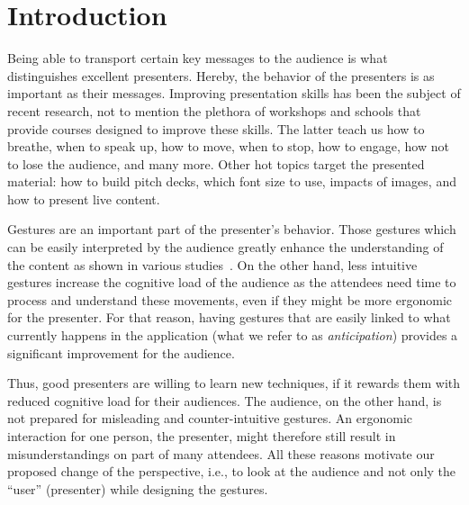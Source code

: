 \documentclass{sigchi}
\begin{document}



\section{Introduction}

Being able to transport certain key messages to the audience is what distinguishes excellent presenters. Hereby, the behavior of the presenters is as important as their messages. Improving presentation skills has been the subject of recent research, not to mention the plethora of workshops and schools that provide courses designed to improve these skills. The latter teach us how to breathe, when to speak up, how to move, when to stop, how to engage, how not to lose the audience, and many more. Other hot topics target the presented material: how to build pitch decks, which font size to use, impacts of images, and how to present live content.

Gestures are an important part of the presenter’s behavior. Those gestures which can be easily interpreted by the audience greatly enhance the understanding of the content as shown in various studies~\cite{importance1, importance2, importance3}. On the other hand, less intuitive gestures increase the cognitive load of the audience as the attendees need time to process and understand these movements, even if they might be more ergonomic for the presenter. For that reason, having gestures that are easily linked to what currently happens in the application (what we refer to as \textit{anticipation}) provides a significant improvement for the audience.

Thus, good presenters are willing to learn new techniques, if it rewards them with reduced cognitive load for their audiences. The audience, on the other hand, is not prepared for misleading and counter-intuitive gestures. An ergonomic interaction for one person, the presenter, might therefore still result in misunderstandings on part of many attendees. All these reasons motivate our proposed change of the perspective, i.e., to look at the audience and not only the “user” (presenter) while designing the gestures. 
\end{document}
